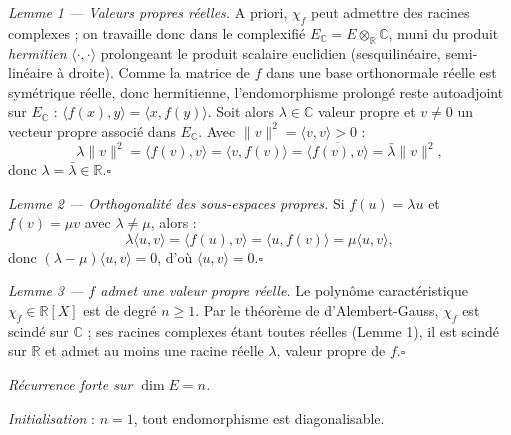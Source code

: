 
\begin{mdframed}[style=proofbar]
  \textit{Lemme 1 — Valeurs propres réelles.}
  A priori, $\chi_f$ peut admettre des racines complexes ; on travaille donc
  dans le complexifié $E_{\mathbb{C}} = E \otimes_{\mathbb{R}} \mathbb{C}$,
  muni du produit \emph{hermitien} $\langle\cdot,\cdot\rangle$ prolongeant le
  produit scalaire euclidien (sesquilinéaire, semi-linéaire à droite). Comme
  la matrice de $f$ dans une base orthonormale réelle est symétrique réelle,
  donc hermitienne, l'endomorphisme prolongé reste autoadjoint sur
  $E_{\mathbb{C}}$ : $\langle f(x),y\rangle = \langle x,f(y)\rangle$. Soit alors
  $\lambda \in \mathbb{C}$ valeur propre et $v\neq 0$ un vecteur propre associé
  dans $E_{\mathbb{C}}$. Avec $\|v\|^2 = \langle v,v\rangle > 0$ :
  \[
    \lambda\|v\|^2 = \langle f(v),v\rangle = \langle v,f(v)\rangle
    = \overline{\langle f(v),v\rangle} = \bar\lambda\|v\|^2,
  \]
  donc $\lambda = \bar\lambda \in \mathbb{R}$.\hfill$\square$

  \medskip
  \textit{Lemme 2 — Orthogonalité des sous-espaces propres.}
  Si $f(u) = \lambda u$ et $f(v) = \mu v$ avec $\lambda\neq\mu$, alors :
  \[
    \lambda\langle u,v\rangle = \langle f(u),v\rangle = \langle u,f(v)\rangle
    = \mu\langle u,v\rangle,
  \]
  donc $(\lambda-\mu)\langle u,v\rangle = 0$, d'où $\langle u,v\rangle = 0$.\hfill$\square$

  \medskip
  \textit{Lemme 3 — $f$ admet une valeur propre réelle.}
  Le polynôme caractéristique $\chi_f \in \mathbb{R}[X]$ est de degré
  $n \geq 1$. Par le théorème de d'Alembert-Gauss, $\chi_f$ est scindé sur
  $\mathbb{C}$ ; ses racines complexes étant toutes réelles (Lemme 1), il
  est scindé sur $\mathbb{R}$ et admet au moins une racine réelle $\lambda$,
  valeur propre de $f$.\hfill$\square$

  \medskip
  \textit{Récurrence forte sur $\dim E = n$.}

  \textit{Initialisation} : $n=1$, tout endomorphisme est diagonalisable.


\end{mdframed}

